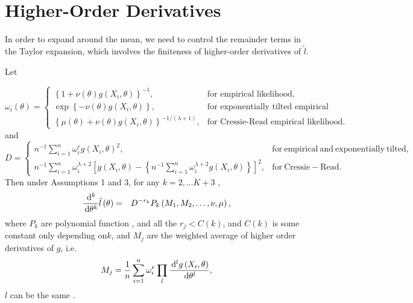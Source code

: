 \section{Higher-Order Derivatives}\label{app:high-order-der}

In order to expand around the mean, we need to control the
remainder terms in the Taylor expansion, which involves the finiteness of higher-order
derivatives of $\tilde{l}$. 
\begin{lemma}
\label{lem:control-higher-order-derivative-l}Let%
\begin{comment}
this lemma need change
\end{comment}
{} 
\[
\omega_{i}\left(\theta\right)=\begin{cases}
\left\{ 1+\nu\left(\theta\right)g\left(X_{i},\theta\right)\right\} ^{-1}, & \text{for empirical likelihood,}\\
\exp\left\{ -\nu\left(\theta\right)g\left(X_{i},\theta\right)\right\} , & \text{for exponentially tilted empirical likelihood,}\\
\left\{ \mu\left(\theta\right)+\nu\left(\theta\right)g\left(X_{i},\theta\right)\right\} ^{-1/\left(\lambda+1\right)}, & \text{for Cressie-Read empirical likelihood.}
\end{cases}
\]
and 
\[
D=\begin{cases}
n^{-1}\sum_{i=1}^{n}\omega_{i}^{r}g\left(X_{i},\theta\right)^{2}, & \mathrm{for\: empirical\: and\: exponentially\:tilted,}\\
n^{-1}\sum_{i=1}^{n}\omega_{i}^{\lambda+2}\left[g\left(X_{i},\theta\right)-\left\{ n^{-1}\sum_{i=1}^{n}\omega_{i}^{\lambda+2}g\left(X_{i},\theta\right)\right\} \right]^{2}, & \mathrm{for\: Cressie-Read.}
\end{cases}
\]
Then  under Assumptions 1 and 3, for any $k=2,\ldots K+3$ , 
\begin{eqnarray*}
\frac{\,\mathrm{d}^{k}}{\,\mathrm{d}\theta^{k}}\tilde{l}\left(\theta\right) & = & D^{-r_{k}}P_{k}\left(M_{1},M_{2},\ldots,\nu,\mu\right),
\end{eqnarray*}
where $P_{k}$ are polynomial function , and all the $r_{j}<C\left(k\right)$,
and $C\left(k\right)$ is some constant only depending on$k$, and
$M_{j}$ are the weighted average of higher order derivatives of $g$,
i.e. 
\[
M_{j}=\frac{1}{n}\sum_{i=1}^{n}\omega_{i}^{r}\prod_{l}\frac{\,\mathrm{d}^{l}g\left(X_{i},\theta\right)}{\,\mathrm{d}\theta^{l}},
\]
$l$ can be the same . \end{lemma}
